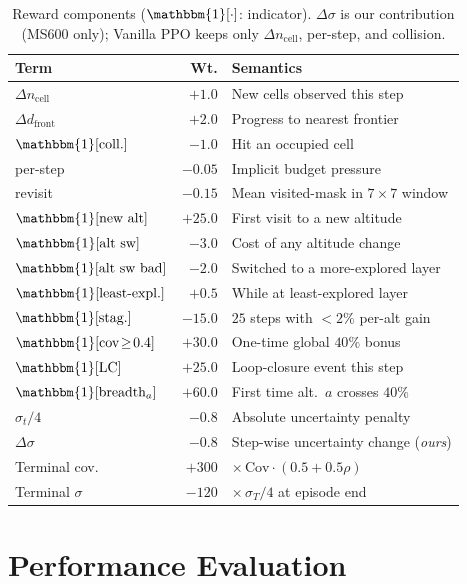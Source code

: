\documentclass[conference]{IEEEtran}
\begin{document}
\begin{table}[t]
\caption{Reward components ($\mathbbm{1}[\cdot]$: indicator). $\Delta\sigma$ is our contribution (MS600 only); Vanilla PPO keeps only $\Delta n_{\text{cell}}$, per-step, and collision.}
\label{tab:reward}
\centering
\footnotesize
\setlength{\tabcolsep}{3pt}
\begin{tabular}{@{}l r p{4.0cm}@{}}
\toprule
Term & Wt. & Semantics \\
\midrule
$\Delta n_{\text{cell}}$ & $+1.0$ & New cells observed this step \\
$\Delta d_{\text{front}}$ & $+2.0$ & Progress to nearest frontier \\
$\mathbbm{1}[\text{coll.}]$ & $-1.0$ & Hit an occupied cell \\
per-step & $-0.05$ & Implicit budget pressure \\
revisit & $-0.15$ & Mean visited-mask in $7{\times}7$ window \\
$\mathbbm{1}[\text{new alt}]$ & $+25.0$ & First visit to a new altitude \\
$\mathbbm{1}[\text{alt sw}]$ & $-3.0$ & Cost of any altitude change \\
$\mathbbm{1}[\text{alt sw bad}]$ & $-2.0$ & Switched to a more-explored layer \\
$\mathbbm{1}[\text{least-expl.}]$ & $+0.5$ & While at least-explored layer \\
$\mathbbm{1}[\text{stag.}]$ & $-15.0$ & $25$ steps with $<\!2\%$ per-alt gain \\
$\mathbbm{1}[\text{cov}\!\geq\!0.4]$ & $+30.0$ & One-time global $40\%$ bonus \\
$\mathbbm{1}[\text{LC}]$ & $+25.0$ & Loop-closure event this step \\
$\mathbbm{1}[\text{breadth}_a]$ & $+60.0$ & First time alt.\ $a$ crosses $40\%$ \\
$\sigma_t/4$ & $-0.8$ & Absolute uncertainty penalty \\
$\Delta\sigma$ & $-0.8$ & Step-wise uncertainty change (\emph{ours}) \\
\midrule
Terminal cov.\ & $+300$ & $\times\,\mathrm{Cov}\!\cdot\!(0.5+0.5\rho)$ \\
Terminal $\sigma$ & $-120$ & $\times\,\sigma_T/4$ at episode end \\
\bottomrule
\end{tabular}
\end{table}

\section{Performance Evaluation}
\end{document}
